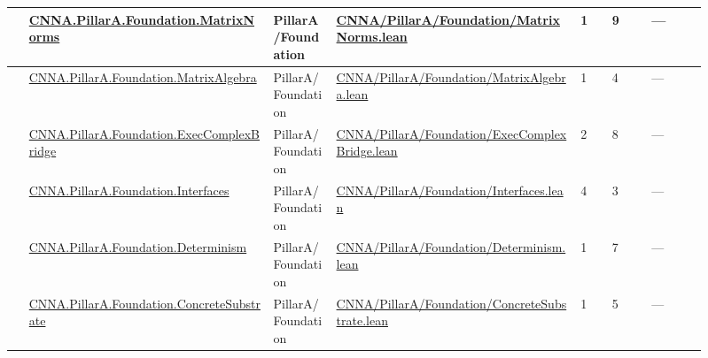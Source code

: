 \begin{longtable}{L{0.025\linewidth} L{0.315\linewidth} L{0.08\linewidth} L{0.315\linewidth} L{0.045\linewidth} L{0.055\linewidth} L{0.07\linewidth}}
\hline
{} & \href{run:repo_snapshot/CNNA/PillarA/Foundation/MatrixNorms.lean}{CNNA.\allowbreak{}PillarA.\allowbreak{}Foundation.\allowbreak{}MatrixNorms} & PillarA/\allowbreak{}Foundation & \href{run:repo_snapshot/CNNA/PillarA/Foundation/MatrixNorms.lean}{CNNA/\allowbreak{}PillarA/\allowbreak{}Foundation/\allowbreak{}MatrixNorms.\allowbreak{}lean} & 1 & 9 & ---\\
\hline
{} & \href{run:repo_snapshot/CNNA/PillarA/Foundation/MatrixAlgebra.lean}{CNNA.\allowbreak{}PillarA.\allowbreak{}Foundation.\allowbreak{}MatrixAlgebra} & PillarA/\allowbreak{}Foundation & \href{run:repo_snapshot/CNNA/PillarA/Foundation/MatrixAlgebra.lean}{CNNA/\allowbreak{}PillarA/\allowbreak{}Foundation/\allowbreak{}MatrixAlgebra.\allowbreak{}lean} & 1 & 4 & ---\\
\hline
{} & \href{run:repo_snapshot/CNNA/PillarA/Foundation/ExecComplexBridge.lean}{CNNA.\allowbreak{}PillarA.\allowbreak{}Foundation.\allowbreak{}ExecComplexBridge} & PillarA/\allowbreak{}Foundation & \href{run:repo_snapshot/CNNA/PillarA/Foundation/ExecComplexBridge.lean}{CNNA/\allowbreak{}PillarA/\allowbreak{}Foundation/\allowbreak{}ExecComplexBridge.\allowbreak{}lean} & 2 & 8 & ---\\
\hline
{} & \href{run:repo_snapshot/CNNA/PillarA/Foundation/Interfaces.lean}{CNNA.\allowbreak{}PillarA.\allowbreak{}Foundation.\allowbreak{}Interfaces} & PillarA/\allowbreak{}Foundation & \href{run:repo_snapshot/CNNA/PillarA/Foundation/Interfaces.lean}{CNNA/\allowbreak{}PillarA/\allowbreak{}Foundation/\allowbreak{}Interfaces.\allowbreak{}lean} & 4 & 3 & ---\\
\hline
{} & \href{run:repo_snapshot/CNNA/PillarA/Foundation/Determinism.lean}{CNNA.\allowbreak{}PillarA.\allowbreak{}Foundation.\allowbreak{}Determinism} & PillarA/\allowbreak{}Foundation & \href{run:repo_snapshot/CNNA/PillarA/Foundation/Determinism.lean}{CNNA/\allowbreak{}PillarA/\allowbreak{}Foundation/\allowbreak{}Determinism.\allowbreak{}lean} & 1 & 7 & ---\\
\hline
{} & \href{run:repo_snapshot/CNNA/PillarA/Foundation/ConcreteSubstrate.lean}{CNNA.\allowbreak{}PillarA.\allowbreak{}Foundation.\allowbreak{}ConcreteSubstrate} & PillarA/\allowbreak{}Foundation & \href{run:repo_snapshot/CNNA/PillarA/Foundation/ConcreteSubstrate.lean}{CNNA/\allowbreak{}PillarA/\allowbreak{}Foundation/\allowbreak{}ConcreteSubstrate.\allowbreak{}lean} & 1 & 5 & ---\\

\end{longtable}
